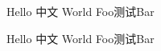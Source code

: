 \documentclass{article}
\begin{document}
Hello 中文 World Foo测试Bar

Hello 中文 World Foo测试Bar
\end{document}
